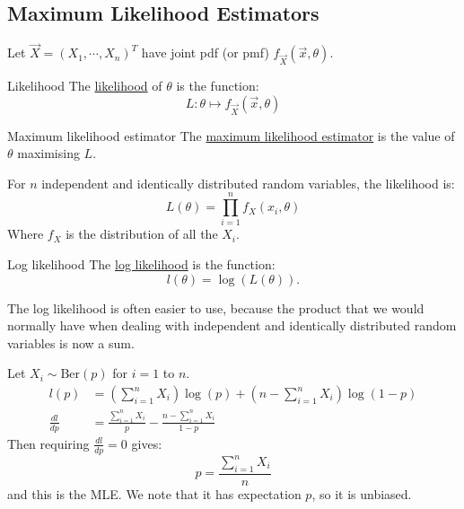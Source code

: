 \documentclass[../Main.tex]{subfiles}
\begin{document}
\subsection{Maximum Likelihood Estimators}
Let $\vec{X} = (X_1, \cdots, X_n)^T$ have joint pdf (or pmf) $f_{\vec{X}} (\vec{x}, \theta)$.
\begin{definition}{Likelihood}
    The \underline{likelihood} of $\theta$ is the function:
    \begin{equation*}
        L : \theta \mapsto f_{\vec{X}} (\vec{x}, \theta)
    \end{equation*}
\end{definition}
\begin{definition}{Maximum likelihood estimator}
    The \underline{maximum likelihood estimator} is the value of $\theta$ maximising $L$.
\end{definition}
For $n$ independent and identically distributed random variables, the likelihood is:
\begin{equation*}
    L(\theta) = \prod_{i=1}^{n} f_{X}(x_i, \theta)
\end{equation*}
Where $f_X$ is the distribution of all the $X_i$.
\begin{definition}{Log likelihood}
    The \underline{log likelihood} is the function:
    \begin{equation*}
        l(\theta) = \log(L(\theta)).
    \end{equation*}
\end{definition}
The log likelihood is often easier to use, because the product that we would normally have when dealing with independent and identically distributed random variables is now a sum.
\begin{example}
    Let $X_i \sim \text{Ber}(p)$ for $i = 1$ to $n$.
    \begin{align*}
        l(p) &= \left(\sum_{i=1}^{n} X_i\right) \log(p) + \left(n - \sum_{i=1}^{n} X_i\right) \log(1-p) \\
        \frac{dl}{dp} &= \frac{\sum_{i=1}^{n} X_i}{p} - \frac{n - \sum_{i=1}^{n} X_i}{1-p} 
    \end{align*}
    Then requiring $\frac{dl}{dp} = 0$ gives:
    \begin{equation*}
        p = \frac{\sum_{i=1}^{n} X_i}{n}
    \end{equation*}
    and this is the MLE. We note that it has expectation $p$, so it is unbiased.
\end{example}
\end{document}
